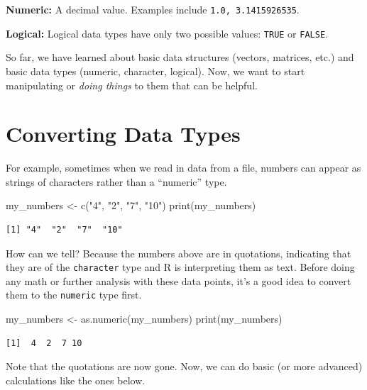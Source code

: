 \documentclass[
  letterpaper,
  DIV=11,
  numbers=noendperiod]{scrreprt}
\newenvironment{Shaded}{\begin{snugshade}}{\end{snugshade}}
\newcommand{\FunctionTok}[1]{\textcolor[rgb]{0.28,0.35,0.67}{#1}}
\newcommand{\NormalTok}[1]{\textcolor[rgb]{0.00,0.23,0.31}{#1}}
\newcommand{\OtherTok}[1]{\textcolor[rgb]{0.00,0.23,0.31}{#1}}
\newcommand{\StringTok}[1]{\textcolor[rgb]{0.13,0.47,0.30}{#1}}
\begin{document}
\textbf{Numeric:} A decimal value. Examples include
\texttt{1.0,\ 3.1415926535}.

\textbf{Logical:} Logical data types have only two possible values:
\texttt{TRUE} or \texttt{FALSE}.

So far, we have learned about basic data structures (vectors, matrices,
etc.) and basic data types (numeric, character, logical). Now, we want
to start manipulating or \emph{doing things} to them that can be
helpful.

\section{Converting Data Types}\label{converting-data-types}

For example, sometimes when we read in data from a file, numbers can
appear as strings of characters rather than a ``numeric'' type.

\begin{Shaded}
\begin{Highlighting}[]
\NormalTok{my\_numbers }\OtherTok{\textless{}{-}} \FunctionTok{c}\NormalTok{(}\StringTok{"4"}\NormalTok{, }\StringTok{"2"}\NormalTok{, }\StringTok{"7"}\NormalTok{, }\StringTok{"10"}\NormalTok{)}
\FunctionTok{print}\NormalTok{(my\_numbers)}
\end{Highlighting}
\end{Shaded}

\begin{verbatim}
[1] "4"  "2"  "7"  "10"
\end{verbatim}

How can we tell? Because the numbers above are in quotations, indicating
that they are of the \texttt{character} type and R is interpreting them
as text. Before doing any math or further analysis with these data
points, it's a good idea to convert them to the \texttt{numeric} type
first.

\begin{Shaded}
\begin{Highlighting}[]
\NormalTok{my\_numbers }\OtherTok{\textless{}{-}} \FunctionTok{as.numeric}\NormalTok{(my\_numbers)}
\FunctionTok{print}\NormalTok{(my\_numbers)}
\end{Highlighting}
\end{Shaded}

\begin{verbatim}
[1]  4  2  7 10
\end{verbatim}

Note that the quotations are now gone. Now, we can do basic (or more
advanced) calculations like the ones below.
\end{document}
